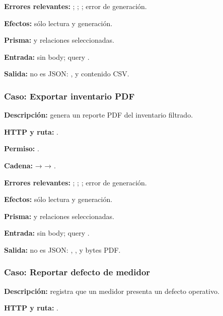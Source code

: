 \textbf{Errores relevantes:} \texttt{}; \texttt{}; \texttt{}; error de generación.  

\textbf{Efectos:} sólo lectura y generación.  

\textbf{Prisma:} \texttt{} y relaciones seleccionadas.  

\textbf{Entrada:} sin body; query \texttt{}.  

\textbf{Salida:} no es JSON: \texttt{}, \texttt{} y contenido CSV.


\subsubsection{Caso: Exportar inventario PDF}


\textbf{Descripción:} genera un reporte PDF del inventario filtrado.  

\textbf{HTTP y ruta:} \texttt{}.  

\textbf{Permiso:} \texttt{}.  

\textbf{Cadena:} \texttt{} → \texttt{} → \texttt{}.  

\textbf{Errores relevantes:} \texttt{}; \texttt{}; \texttt{}; error de generación.  

\textbf{Efectos:} sólo lectura y generación.  

\textbf{Prisma:} \texttt{} y relaciones seleccionadas.  

\textbf{Entrada:} sin body; query \texttt{}.  

\textbf{Salida:} no es JSON: \texttt{}, \texttt{}, \texttt{} y bytes PDF.


\subsubsection{Caso: Reportar defecto de medidor}


\textbf{Descripción:} registra que un medidor presenta un defecto operativo.  

\textbf{HTTP y ruta:} \texttt{}.  

